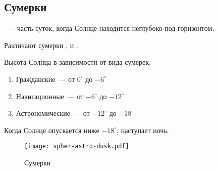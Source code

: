 \subsection{Сумерки}
~--- часть суток, когда Солнце находится неглубоко под горизонтом. 

Различают сумерки ,  и . 

Высота Солнца в зависимости от вида сумерек:
\begin{enumerate}
\item Гражданские~--- от $0^{\circ}$ до $-6^{\circ}$
\item Навигационные~--- от $-6^{\circ}$ до $-12^{\circ}$
\item Астрономические~--- от $-12^{\circ}$ до $-18^{\circ}$
\end{enumerate}

Когда Солнце опускается ниже $-18^{\circ}$, наступает ночь.

\begin{center}
\begin{figure}[h!]
\centering
 \texttt{[image: spher-astro-dusk.pdf]}
 \caption{Сумерки}
\end{figure}
\end{center}